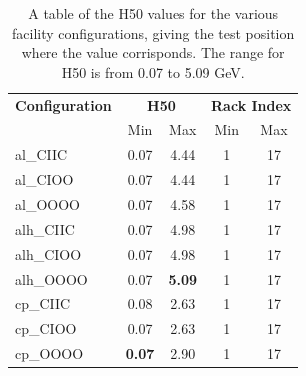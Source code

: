 \documentclass[main.tex]{subfiles}
\begin{document}
\begin{table}[htbp]
  \centering
    \begin{tabular}{l|c|c|c|c}
    \multicolumn{1}{c|}{\textbf{Configuration}} & 
    \multicolumn{2}{c|}{\textbf{H50}} & 
    \multicolumn{2}{c}{\textbf{Rack Index}} \\
    \multicolumn{1}{c|}{\textbf{}} & 
    \multicolumn{1}{c}{Min} & 
    \multicolumn{1}{|c|}{Max} & 
    \multicolumn{1}{c}{Min} & 
    \multicolumn{1}{|c}{Max} \\
	\hline
	\hline
    al\_CIIC & 0.07  & 4.44  & 1     & 17 \\
    al\_CIOO & 0.07  & 4.44  & 1     & 17 \\
    al\_OOOO & 0.07  & 4.58  & 1     & 17 \\
    alh\_CIIC & 0.07  & 4.98  & 1     & 17 \\
    alh\_CIOO & 0.07  & 4.98  & 1     & 17 \\
    alh\_OOOO & 0.07  & \textbf{5.09} & 1     & 17 \\
    cp\_CIIC & 0.08  & 2.63  & 1     & 17 \\
    cp\_CIOO & 0.07  & 2.63  & 1     & 17 \\
    cp\_OOOO & \textbf{0.07} & 2.90  & 1     & 17 \\
    \end{tabular}
	\caption{A table of the H50 values for the various facility configurations, giving the test position where the value corrisponds. The range for H50 is from 0.07 to 5.09 GeV.}
	\label{tab:hardness50}
\end{table}
\end{document}
